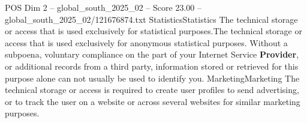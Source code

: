 \begin{textsample}{POS Dim 2 – global\_south\_2025\_02 – Score 23.00 – global\_south\_2025\_02/121676874.txt}
StatisticsStatistics The technical storage or access that is used exclusively for statistical purposes.The technical storage or access that is used exclusively for anonymous statistical purposes.
Without a subpoena, voluntary compliance on the part of your Internet Service \textbf{Provider}, or additional records from a third party, information stored or retrieved for this purpose alone can not usually be used to identify you.
MarketingMarketing The technical storage or access is required to create user profiles to send advertising, or to track the user on a website or across several websites for similar marketing purposes.

\end{textsample}
